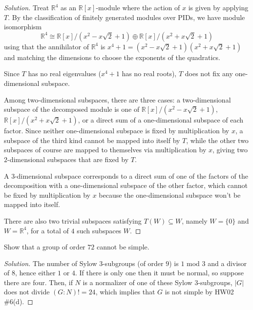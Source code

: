 \documentclass[10pt]{article}
\providecommand{\RR}{\mathbb R}
\newenvironment{soln}{\begin{proof}[Solution]}{\end{proof}}
\providecommand{\abs}[1]{\left|#1\right|}
\begin{document}
\begin{soln}
    Treat $\RR^4$ as an $\RR[x]$-module where the action of $x$
    is given by applying $T$. By the classification of
    finitely generated modules over PIDs, we have module isomorphism
    \begin{equation*}
	\RR^4\cong\RR[x]/(x^2 - x\sqrt 2 + 1)\oplus\RR[x]/(x^2 + x\sqrt 2 + 1)
    \end{equation*}
    using that the annihilator of $\RR^4$ is
    $x^4 + 1 = (x^2 - x\sqrt 2 + 1)(x^2 + x\sqrt 2 + 1)$
    and matching the dimensions to choose the exponents of the quadratics.

    Since $T$ has no real eigenvalues ($x^4+1$ has no real roots),
    $T$ does not fix any one-dimensional subspace.

    Among two-dimensional subspaces, there are three cases:
    a two-dimensional subspace of the decomposed module
    is one of $\RR[x]/(x^2 - x\sqrt 2 + 1)$,
    $\RR[x]/(x^2 + x\sqrt 2 + 1)$, or
    a direct sum of a one-dimensional subspace of each factor.
    Since neither one-dimensional subspace is fixed by multiplication by $x$,
    a subspace of the third kind cannot be mapped into itself by $T$,
    while the other two subspaces of course are mapped to themselves
    via multiplication by $x$, giving two $2$-dimensional subspaces
    that are fixed by $T$.

    A $3$-dimensional subspace corresponds to
    a direct sum of one of the factors of the decomposition
    with a one-dimensional subspace of the other factor,
    which cannot be fixed by multiplication by $x$
    because the one-dimensional subspace won't be mapped into itself.

    There are also two trivial subspaces satisfying $T(W)\subseteq W$,
    namely $W = \{0\}$ and $W = \RR^4$, for a total of
    $\boxed 4$ such subspaces $W$.
\end{soln}

\begin{problem}
    Show that a group of order $72$ cannot be simple.
\end{problem}

\begin{soln}
    The number of Sylow $3$-subgroups (of order $9$)
    is $1$ mod $3$ and a divisor of $8$,
    hence either $1$ or $4$. If there is only one then it must be normal,
    so suppose there are four. Then, if $N$ is a normalizer
    of one of these Sylow $3$-subgroups, $\abs G$ does not divide
    $(G:N)! = 24$, which implies that $G$ is not simple by HW02 \#6(d).
\end{soln}
\end{document}
